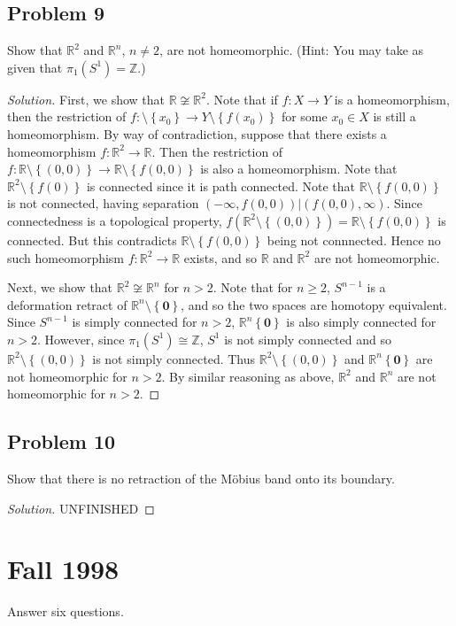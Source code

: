 \documentclass[12pt]{article}
\newcommand{\z}{\mathbb{Z}}
\newcommand{\real}{\mathbb{R}}
\newcommand\paren[1]{\left( #1 \right)}
\newcommand\setb[1]{\left \{ #1 \right \}}
\theoremstyle{definition}
\begin{document}
\subsection{Problem 9 \texorpdfstring{\cite{Ricky}}{}}
Show that $\real^2$ and $\real^n$, $n \neq 2$, are not homeomorphic. (Hint: You may take as given that $\pi_1(S^1) = \z$.)
\begin{proof}[Solution]
    First, we show that $\real \not\cong \real^2$. Note that if $f : X \to Y$ is a homeomorphism, then the restriction of $f : \setminus \setb{ x_0 } \to Y \setminus \setb{ f(x_0) }$ for some $x_0 \in X$ is still a homeomorphism. By way of contradiction, suppose that there exists a homeomorphism $f : \real^2 \to \real$. Then the restriction of $f : \real \setminus \setb{ (0,0) } \to \real \setminus \setb{ f(0,0) }$ is also a homeomorphism. Note that $\real^2 \setminus \setb{ f(0) }$ is connected since it is path connected. Note that $\real \setminus \setb{ f(0,0) }$ is not connected, having separation $(-\infty, f(0,0)) | (f(0,0) , \infty)$. Since connectedness is a topological property, $f \paren{ \real^2 \setminus \setb{ (0,0) } } = \real \setminus \setb{ f(0,0) }$ is connected. But this contradicts $\real \setminus \setb{ f(0,0) }$ being not connnected. Hence no such homeomorphism $f : \real^2 \to \real$ exists, and so $\real$ and $\real^2$ are not homeomorphic. 
    
    Next, we show that $\real^2 \not\cong \real^n$ for $n > 2$. Note that for $n \geq 2$, $S^{n-1}$ is a deformation retract of $\real^n \setminus \setb{ \mathbf{0} }$, and so the two spaces are homotopy equivalent. Since $S^{n-1}$ is simply connected for $n > 2$, $\real^n \setb{ \mathbf{0} }$ is also simply connected for $n > 2$. However, since $\pi_1(S^1) \cong \z$, $S^1$ is not simply connected and so $\real^2 \setminus \setb{ (0,0) }$ is not simply connected. Thus $\real^2 \setminus \setb{ (0,0) }$ and $\real^n \setb{ \mathbf{0} }$ are not homeomorphic for $n > 2$. By similar reasoning as above, $\real^2$ and $\real^n$ are not homeomorphic for $n > 2$. 
\end{proof}
\subsection{Problem 10}
Show that there is no retraction of the M\"obius band onto its boundary.
\begin{proof}[Solution]
    UNFINISHED
\end{proof}
\newpage
\section{Fall 1998}
Answer six questions.
\end{document}
